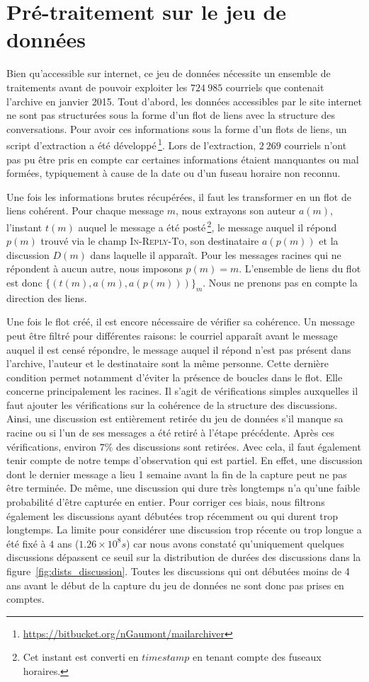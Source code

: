 \section{Pré-traitement sur le jeu de données}
Bien qu'accessible sur internet, ce jeu de données nécessite un ensemble de traitements avant de pouvoir exploiter les $724\ 985$ courriels que contenait l'archive en janvier 2015.
Tout d'abord, les données accessibles par le site internet ne sont pas  structurées sous la forme d'un flot de liens avec la structure des conversations.
Pour avoir ces informations sous la forme d'un flots de liens, un script d'extraction a été développé\,\footnote{\url{https://bitbucket.org/nGaumont/mailarchiver}}.
Lors de l'extraction, $2\ 269$ courriels n'ont pas pu être pris en compte car certaines informations étaient manquantes ou mal formées, typiquement à cause de la date ou d'un fuseau horaire non reconnu.

Une fois les informations brutes récupérées, il faut les transformer en un flot de liens cohérent.
Pour chaque message $m$, nous extrayons son auteur $a(m)$, l'instant $t(m)$ auquel le message a été posté\,\footnote{Cet instant est converti en $timestamp$ en tenant compte des fuseaux horaires.}, le message auquel il répond $p(m)$ trouvé via le champ \textsc{In-Reply-To}, son destinataire $a(p(m))$ et la discussion $D(m)$ dans laquelle il apparaît.
Pour les messages racines qui ne répondent à aucun autre, nous imposons $p(m)=m$.
L'ensemble de liens du flot est donc $\{(t(m),a(m),a(p(m)))\}_m$.
Nous ne prenons pas en compte la direction des liens.

Une fois le flot créé, il est encore nécessaire de vérifier sa cohérence.
Un message peut être filtré pour différentes raisons: le courriel apparaît avant le message auquel il est censé répondre, le message auquel il répond n'est pas présent dans l'archive, l'auteur et le destinataire sont la même personne.
Cette dernière condition permet notamment d'éviter la présence de boucles dans le flot.
Elle concerne principalement les racines.
Il s'agit de vérifications simples auxquelles il faut ajouter les vérifications sur la cohérence de la structure des discussions.
Ainsi, une discussion est entièrement retirée du jeu de données s'il manque sa racine ou si l'un de ses messages a été retiré à l'étape précédente.
Après ces vérifications, environ $7\%$ des discussions sont retirées.
Avec cela, il faut également tenir compte de notre temps d'observation qui est partiel.
En effet, une discussion dont le dernier message a lieu 1 semaine avant la fin de la capture peut ne pas être terminée.
De même, une discussion qui dure très longtemps n'a qu'une faible probabilité d'être capturée en entier.
Pour corriger ces biais, nous filtrons également les discussions ayant débutées trop récemment ou qui durent trop longtemps.
La limite pour considérer une discussion trop récente ou trop longue a été fixé à $4$ ans ($1.26\times 10^8 s$) car nous avons constaté qu'uniquement quelques discussions dépassent ce seuil sur la distribution de durées des discussions dans la figure~\ref{fig:dists_discussion}.
Toutes les discussions qui ont débutées moins de 4 ans avant le début de la capture du jeu de données ne sont donc pas prises en comptes.



